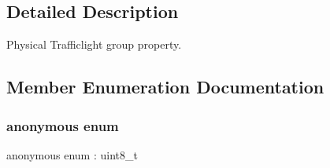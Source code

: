 \subsection{Detailed Description}
Physical Trafficlight group property. 

\subsection{Member Enumeration Documentation}
\mbox{\label{structmaf__perception__interface_1_1TrafficLightGroupPropertyEnum_a2e67b35f31610c6dc78afbcd9f8cacda}} 
\subsubsection{\texorpdfstring{anonymous enum}{anonymous enum}}
{\footnotesize\ttfamily anonymous enum \+: uint8\+\_\+t}

